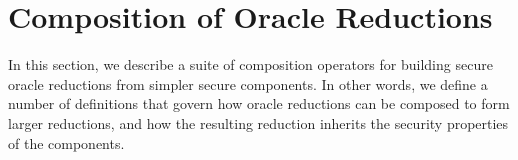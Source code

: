 \section{Composition of Oracle Reductions}\label{sec:composition_oracle_reductions}

In this section, we describe a suite of composition operators for building secure oracle reductions from simpler secure components. In other words, we define a number of definitions that govern how oracle reductions can be composed to form larger reductions, and how the resulting reduction inherits the security properties of the components.







